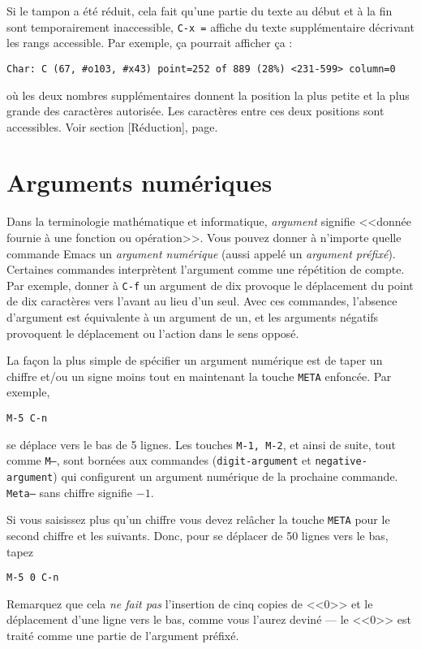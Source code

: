 Si le tampon a été réduit, cela fait qu'une partie du texte au début et
à la fin sont temporairement inaccessible, \texttt{C-x =} affiche du
texte supplémentaire décrivant les rangs accessible. Par exemple,
\c{c}a pourrait afficher \c{c}a :
\begin{center}
  \texttt{Char: C (67, \#o103, \#x43) point=252 of 889 (28\%)
    <231-599> column=0}
\end{center}
où les deux nombres supplémentaires donnent la position la plus petite
et la plus grande des caractères autorisée. Les caractères entre ces
deux positions sont accessibles. Voir section
[Réduction], page.\par

\section{Arguments numériques}
Dans la terminologie mathématique et informatique, \emph{argument}
signifie <<donnée fournie à une fonction ou opération>>. Vous pouvez
donner à n'importe quelle commande Emacs un \emph{argument numérique}
(aussi appelé un \emph{argument préfixé}). Certaines commandes
interprètent l'argument comme une répétition de compte. Par exemple,
donner à \texttt{C-f} un argument de dix provoque le déplacement du
point de dix caractères vers l'avant au lieu d'un seul. Avec ces
commandes, l'absence d'argument est équivalente à un argument de un,
et les arguments négatifs provoquent le déplacement ou l'action dans
le sens opposé.\par

La façon la plus simple de spécifier un argument numérique est de
taper un chiffre et/ou un signe moins tout en maintenant la touche
\texttt{META} enfoncée. Par exemple,
\begin{center}
  \texttt{M-5 C-n}
\end{center}
se déplace vers le bas de 5 lignes. Les touches \texttt{M-1, M-2}, et
ainsi de suite, tout comme \texttt{M--}, sont bornées aux commandes
(\texttt{digit-argument} et \texttt{negative-argument}) qui
configurent un argument numérique de la prochaine
commande. \texttt{Meta--} sans chiffre signifie $-1$.\par

Si vous saisissez plus qu'un chiffre vous devez relâcher la touche
\texttt{META} pour le second chiffre et les suivants. Donc, pour se
déplacer de 50 lignes vers le bas, tapez
\begin{center}
  \texttt{M-5 0 C-n}
\end{center}
Remarquez que cela \emph{ne fait pas} l'insertion de cinq copies de
<<$0$>> et le déplacement d'une ligne vers le bas, comme vous l'aurez
deviné --- le <<$0$>> est traité comme une partie de l'argument
préfixé.\par

